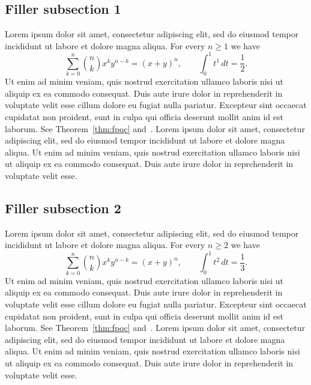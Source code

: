 \documentclass[11pt]{amsart}
\theoremstyle{definition}
\theoremstyle{remark}
\begin{document}
{\subsection{Filler subsection 1}
Lorem ipsum dolor sit amet, consectetur adipiscing elit, sed do eiusmod
tempor incididunt ut labore et dolore magna aliqua. For every $n\ge 1$ we have
\[
\sum_{k=0}^{n}\binom{n}{k}x^k y^{n-k}=(x+y)^n,\qquad
\int_0^1 t^{1}\,dt=\frac{1}{2}.
\]
Ut enim ad minim veniam, quis nostrud exercitation ullamco laboris nisi ut
aliquip ex ea commodo consequat. Duis aute irure dolor in reprehenderit in
voluptate velit esse cillum dolore eu fugiat nulla pariatur. Excepteur sint
occaecat cupidatat non proident, sunt in culpa qui officia deserunt mollit
anim id est laborum. See Theorem~\ref{thm:fpqc} and~\cite{Vistoli}.
Lorem ipsum dolor sit amet, consectetur adipiscing elit, sed do eiusmod
tempor incididunt ut labore et dolore magna aliqua. Ut enim ad minim veniam,
quis nostrud exercitation ullamco laboris nisi ut aliquip ex ea commodo
consequat. Duis aute irure dolor in reprehenderit in voluptate velit esse.

\subsection{Filler subsection 2}
Lorem ipsum dolor sit amet, consectetur adipiscing elit, sed do eiusmod
tempor incididunt ut labore et dolore magna aliqua. For every $n\ge 2$ we have
\[
\sum_{k=0}^{n}\binom{n}{k}x^k y^{n-k}=(x+y)^n,\qquad
\int_0^1 t^{2}\,dt=\frac{1}{3}.
\]
Ut enim ad minim veniam, quis nostrud exercitation ullamco laboris nisi ut
aliquip ex ea commodo consequat. Duis aute irure dolor in reprehenderit in
voluptate velit esse cillum dolore eu fugiat nulla pariatur. Excepteur sint
occaecat cupidatat non proident, sunt in culpa qui officia deserunt mollit
anim id est laborum. See Theorem~\ref{thm:fpqc} and~\cite{Vistoli}.
Lorem ipsum dolor sit amet, consectetur adipiscing elit, sed do eiusmod
tempor incididunt ut labore et dolore magna aliqua. Ut enim ad minim veniam,
quis nostrud exercitation ullamco laboris nisi ut aliquip ex ea commodo
consequat. Duis aute irure dolor in reprehenderit in voluptate velit esse.

}
\end{document}
